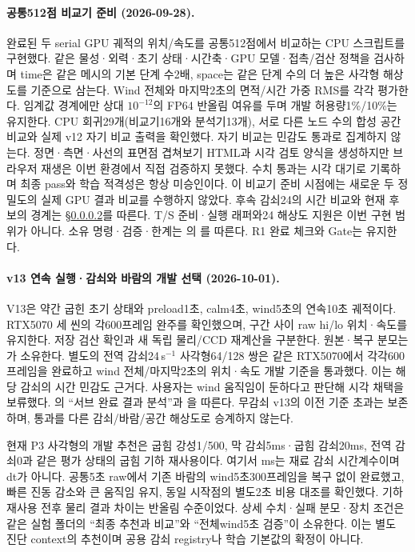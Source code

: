 \documentclass[10pt]{article}
\begin{document}
\paragraph{공통512점 비교기 준비 (2026-09-28).}
\label{sec:r1-cg-comparator-ready}
완료된 두 serial GPU 궤적의 위치/속도를 공통512점에서 비교하는 CPU 스크립트를 구현했다.
같은 물성·외력·초기 상태·시간축·GPU 모델·접촉/검산 정책을 검사하며 time은 같은 메시의
기본 단계 수2배, space는 같은 단계 수의 더 높은 사각형 해상도를 기준으로 삼는다.
Wind 전체와 마지막2초의 면적/시간 가중 RMS를 각각 평가한다. 임계값 경계에만
상대 $10^{-12}$의 FP64 반올림 여유를 두며 개발 허용량1\%/10\%는 유지한다.
CPU 회귀29개(비교기16개와 분석기13개), 서로 다른 노드 수의 합성 공간 비교와
실제 v12 자기 비교 출력을 확인했다. 자기 비교는 민감도 통과로 집계하지 않는다.
정면·측면·사선의 표면점 겹쳐보기 HTML과 시각 검토 양식을 생성하지만 브라우저 재생은
이번 환경에서 직접 검증하지 못했다. 수치 통과는 시각 대기로 기록하며 최종 pass와 학습 적격성은
항상 미승인이다. 이 비교기 준비 시점에는 새로운 두 정밀도의 실제 GPU 결과 비교를 수행하지 않았다.
후속 감쇠24의 시간 비교와 현재 후보의 경계는 \S\ref{sec:r1-cg-wind-damping-status}를 따른다.
T/S 준비·실행 래퍼와24 해상도 지원은 이번 구현 범위가 아니다.
소유 명령·검증·한계는 의
를 따른다. R1 완료 체크와 Gate는 유지한다.

\paragraph{v13 연속 실행·감쇠와 바람의 개발 선택 (2026-10-01).}
\label{sec:r1-cg-wind-damping-status}
V13은 약간 굽힌 초기 상태와 preload1초, calm4초, wind5초의 연속10초 궤적이다.
RTX5070 세 씬의 각600프레임 완주를 확인했으며, 구간 사이 raw hi/lo 위치·속도를 유지한다.
저장 검산 확인과 새 독립 물리/CCD 재계산을 구분한다. 원본·복구 분모는
가 소유한다.
별도의 전역 감쇠24\,s$^{-1}$ 사각형64/128 쌍은 같은 RTX5070에서 각각600프레임을 완료하고
wind 전체/마지막2초의 위치·속도 개발 기준을 통과했다. 이는 해당 감쇠의 시간 민감도 근거다.
사용자는 wind 움직임이 둔하다고 판단해 시각 채택을 보류했다.
의 ``서브 완료 결과 분석''과 을 따른다.
무감쇠 v13의 이전 기준 초과는 보존하며, 통과를 다른 감쇠/바람/공간 해상도로 승계하지 않는다.

현재 P3 사각형의 개발 추천은 굽힘 강성1/500, 막 감쇠5ms·굽힘 감쇠20ms,
전역 감쇠0과 같은 평가 상태의 굽힘 기하 재사용이다. 여기서 ms는 재료 감쇠 시간계수이며 dt가 아니다.
공통5초 raw에서 기존 바람의 wind5초300프레임을 복구 없이 완료했고,
빠른 진동 감소와 큰 움직임 유지, 동일 시작점의 별도2초 비용 대조를 확인했다.
기하 재사용 전후 물리 결과 차이는 반올림 수준이었다. 상세 수치·실패 분모·장치 조건은
같은 실험 폴더의  ``최종 추천과 비교''와 ``전체wind5초 검증''이 소유한다.
이는 별도 진단 context의 추천이며 공용 감쇠 registry나 학습 기본값의 확정이 아니다.
\end{document}
